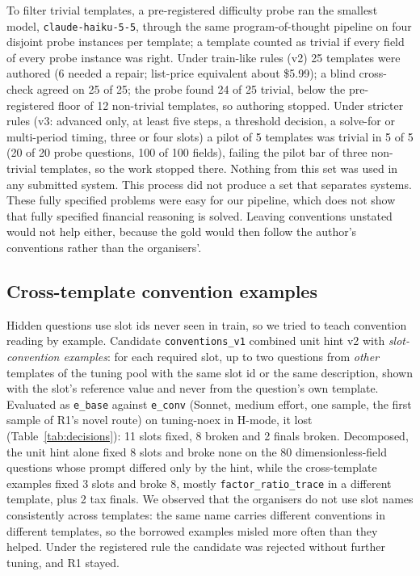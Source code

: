 \documentclass[conference]{IEEEtran}
\newcommand{\id}[1]{\texttt{#1}}
\begin{document}
To filter trivial templates, a pre-registered difficulty probe ran the smallest model, \id{claude-haiku-5-5}, through the same program-of-thought pipeline on four disjoint probe instances per template; a template counted as trivial if every field of every probe instance was right. Under train-like rules (v2) 25 templates were authored (6 needed a repair; list-price equivalent about \$5.99); a blind cross-check agreed on 25 of 25; the probe found 24 of 25 trivial, below the pre-registered floor of 12 non-trivial templates, so authoring stopped. Under stricter rules (v3: advanced only, at least five steps, a threshold decision, a solve-for or multi-period timing, three or four slots) a pilot of 5 templates was trivial in 5 of 5 (20 of 20 probe questions, 100 of 100 fields), failing the pilot bar of three non-trivial templates, so the work stopped there. Nothing from this set was used in any submitted system. This process did not produce a set that separates systems. These fully specified problems were easy for our pipeline, which does not show that fully specified financial reasoning is solved. Leaving conventions unstated would not help either, because the gold would then follow the author's conventions rather than the organisers'.

\subsection{Cross-template convention examples}
Hidden questions use slot ids never seen in train, so we tried to teach convention reading by example. Candidate \id{conventions\_v1} combined unit hint v2 with \emph{slot-convention examples}: for each required slot, up to two questions from \emph{other} templates of the tuning pool with the same slot id or the same description, shown with the slot's reference value and never from the question's own template. Evaluated as \id{e\_base} against \id{e\_conv} (Sonnet, medium effort, one sample, the first sample of R1's novel route) on tuning-noex in H-mode, it lost (Table~\ref{tab:decisions}): 11 slots fixed, 8 broken and 2 finals broken. Decomposed, the unit hint alone fixed 8 slots and broke none on the 80 dimensionless-field questions whose prompt differed only by the hint, while the cross-template examples fixed 3 slots and broke 8, mostly \id{factor\_ratio\_trace} in a different template, plus 2 tax finals. We observed that the organisers do not use slot names consistently across templates: the same name carries different conventions in different templates, so the borrowed examples misled more often than they helped. Under the registered rule the candidate was rejected without further tuning, and R1 stayed.
\end{document}
